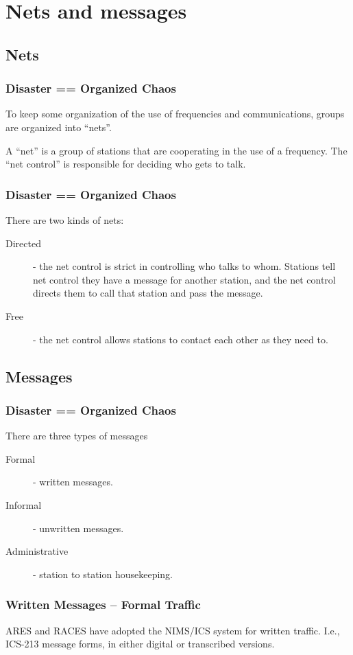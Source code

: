 \documentclass[10pt, handout]{beamer}
\begin{document}
\section{Nets and messages}
\subsection{Nets}

\begin{frame}
\frametitle{Disaster == Organized Chaos}
To keep some organization of the use of frequencies and communications,  groups are organized into “nets”.

A “net” is a group of stations that are cooperating in the use of a frequency. The “net control” is responsible for deciding who gets to talk. 
\end{frame}

\begin{frame}
\frametitle{Disaster == Organized Chaos}
There are two kinds of nets:
 \begin{description}
\item[Directed] - the net control is strict in controlling who talks to whom.  Stations tell net control they have a message for another station, and the net control directs them to call that station and pass the message.
\item[Free] - the net control allows stations to contact each other as they need to.   
\end{description}
\end{frame}

\subsection{Messages}

\begin{frame}
\frametitle{Disaster == Organized Chaos}
There are three types of messages
\begin{description}
\item[Formal] - written messages.
\item[Informal] - unwritten messages.
\item[Administrative] - station to station housekeeping.
\end{description}
\end{frame}

\begin{frame}
\frametitle{Written Messages – Formal Traffic}
ARES and RACES have adopted the NIMS/ICS system for written traffic. I.e., ICS-213 message forms, in either digital or transcribed versions.\\ \hfil \\
 
\end{frame}
\end{document}
